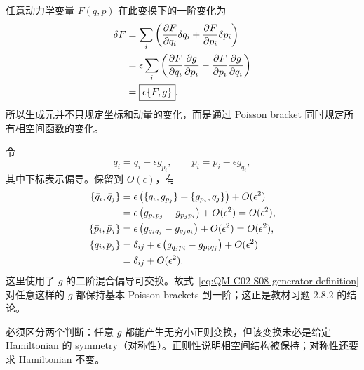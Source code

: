 任意动力学变量 $F(q,p)$ 在此变换下的一阶变化为
\begin{align}
  \delta F
  &=\sum_i\left(
    \frac{\partial F}{\partial q_i}\delta q_i
    +\frac{\partial F}{\partial p_i}\delta p_i
  \right) \notag\\
  &=\epsilon\sum_i\left(
    \frac{\partial F}{\partial q_i}
    \frac{\partial g}{\partial p_i}
    -\frac{\partial F}{\partial p_i}
    \frac{\partial g}{\partial q_i}
  \right) \notag\\
  &=\boxed{\epsilon\{F,g\}}.
  \label{eq:QM-C02-S08-variable-response}
\end{align}
所以生成元并不只规定坐标和动量的变化，而是通过 Poisson bracket 同时规定所有相空间函数的变化。


令
\[
  \bar q_i=q_i+\epsilon g_{p_i},
  \qquad
  \bar p_i=p_i-\epsilon g_{q_i},
\]
其中下标表示偏导。保留到 $O(\epsilon)$，有
\begin{align}
  \{\bar q_i,\bar q_j\}
  &=\epsilon\left(
    \{q_i,g_{p_j}\}+\{g_{p_i},q_j\}
  \right)+O(\epsilon^2) \notag\\
  &=\epsilon\left(
    g_{p_ip_j}-g_{p_jp_i}
  \right)+O(\epsilon^2)
  =O(\epsilon^2),
  \label{eq:QM-C02-S08-infinitesimal-qq}\\
  \{\bar p_i,\bar p_j\}
  &=\epsilon\left(
    g_{q_iq_j}-g_{q_jq_i}
  \right)+O(\epsilon^2)
  =O(\epsilon^2),
  \label{eq:QM-C02-S08-infinitesimal-pp}\\
  \{\bar q_i,\bar p_j\}
  &=\delta_{ij}
    +\epsilon\left(
      g_{q_jp_i}-g_{p_iq_j}
    \right)+O(\epsilon^2) \notag\\
  &=\delta_{ij}+O(\epsilon^2).
  \label{eq:QM-C02-S08-infinitesimal-qp}
\end{align}
这里使用了 $g$ 的二阶混合偏导可交换。故式~\eqref{eq:QM-C02-S08-generator-definition} 对任意这样的 $g$ 都保持基本 Poisson brackets 到一阶；这正是教材习题 2.8.2 的结论。

必须区分两个判断：任意 $g$ 都能产生无穷小正则变换，但该变换未必是给定 Hamiltonian 的 symmetry（对称性）。正则性说明相空间结构被保持；对称性还要求 Hamiltonian 不变。


